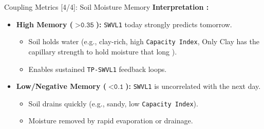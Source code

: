 \documentclass[8pt, aspectratio=169]{beamer}
\begin{document}
\begin{frame}{Coupling Metrics [4/4]: Soil Moisture Memory}
    \vspace{0.2cm}
    \footnotesize
    \textbf{Interpretation :}
        \begin{itemize}
            \item \textbf{High Memory ($> \texttt{0.35}$):} \texttt{SWVL1} today strongly predicts tomorrow.
                \footnotesize
                \begin{itemize}
                    \item Soil holds water (e.g., clay-rich, high \texttt{Capacity Index}, 
                    \tiny Only Clay has the capillary strength to hold moisture that long
                    \footnotesize ).
                    \item Enables sustained \texttt{TP-SWVL1} feedback loops.
                \end{itemize}
            \item \textbf{Low/Negative Memory ($< \texttt{0.1}$):} \texttt{SWVL1} is uncorrelated with the next day.
                \footnotesize
                \begin{itemize}
                    \item Soil drains quickly (e.g., sandy, low \texttt{Capacity Index}).
                    \item Moisture removed by rapid evaporation or drainage.
                \end{itemize}
        \end{itemize}
\end{frame}
\end{document}
